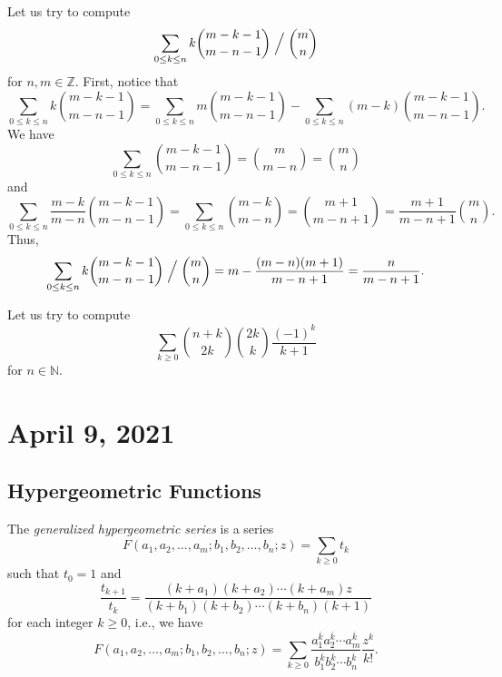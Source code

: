 \documentclass[11pt]{article}
\newcommand{\NN}{\mathbb{N}}
\newcommand{\ZZ}{\mathbb{Z}}
\begin{document}
\begin{example}
  Let us try to compute
  \begin{equation*}
    \sum_{0 \leq k \leq n} k\binom{m-k-1}{m-n-1} \Bigm/ \binom{m}{n}
  \end{equation*}
  for $n, m \in \ZZ$.
  First, notice that
  \begin{equation*}
    \sum_{0 \leq k \leq n} k\binom{m-k-1}{m-n-1}
    = \sum_{0 \leq k \leq n} m\binom{m-k-1}{m-n-1} - \sum_{0 \leq k \leq n} (m-k)\binom{m-k-1}{m-n-1}.
  \end{equation*}
  We have
  \begin{equation*}
    \sum_{0 \leq k \leq n} \binom{m-k-1}{m-n-1} = \binom{m}{m-n} = \binom{m}{n}
  \end{equation*}
  and
  \begin{equation*}
    \sum_{0 \leq k \leq n} \frac{m-k}{m-n}\binom{m-k-1}{m-n-1} = \sum_{0 \leq k \leq n} \binom{m-k}{m-n} = \binom{m+1}{m-n+1} = \frac{m+1}{m-n+1}\binom{m}{n}.
  \end{equation*}
  Thus,
  \begin{equation*}
    \sum_{0 \leq k \leq n} k\binom{m-k-1}{m-n-1} \Bigm/ \binom{m}{n}
    = m - \frac{(m-n)(m+1)}{m-n+1}
    = \frac{n}{m-n+1}.
  \end{equation*}
\end{example}

\begin{example}
  Let us try to compute
  \begin{equation*}
    \sum_{k \geq 0} \binom{n+k}{2k} \binom{2k}{k} \frac{(-1)^k}{k+1}
  \end{equation*}
  for $n \in \NN$.
\end{example}

\section{April 9, 2021}
\subsection{Hypergeometric Functions}
The \emph{generalized hypergeometric series} is a series
\begin{equation*}
  F(a_1, a_2, \dots, a_m; b_1, b_2, \dots, b_n; z) = \sum_{k \geq 0} t_k
\end{equation*}
such that $t_0 = 1$ and
\begin{equation*}
  \frac{t_{k+1}}{t_k} = \frac{(k + a_1)(k + a_2) \cdots (k + a_m)z}{(k + b_1)(k + b_2) \cdots (k + b_n)(k + 1)}
\end{equation*}
for each integer $k \geq 0$, i.e., we have
\begin{equation*}
  F(a_1, a_2, \dots, a_m; b_1, b_2, \dots, b_n; z) = \sum_{k \geq 0} \frac{a_1^{\overline{k}}a_2^{\overline{k}} \cdots a_m^{\overline{k}}}{b_1^{\overline{k}}b_2^{\overline{k}} \cdots b_n^{\overline{k}}} \frac{z^k}{k!}.
\end{equation*}
\end{document}
